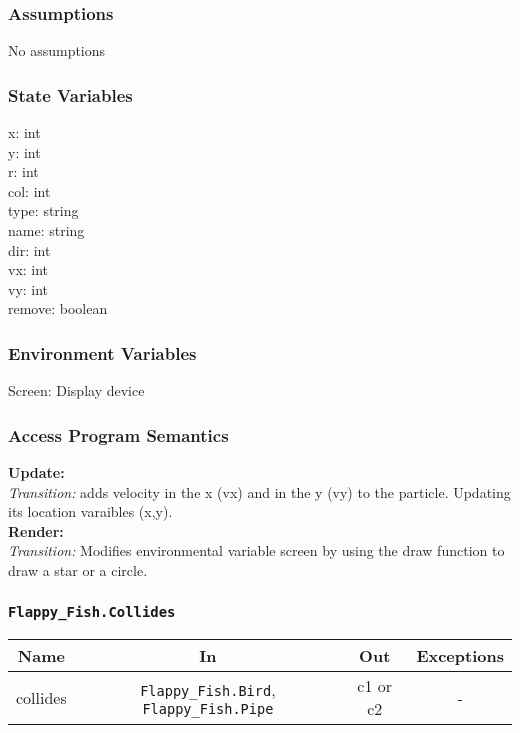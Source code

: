 \documentclass[11pt, oneside]{article}   	%
\begin{document}
\subsubsection{Assumptions}
No assumptions

\subsubsection{State Variables}
x: int\\
y: int\\
r: int \\
col: int \\
type: string\\
name: string \\
dir: int\\
vx: int \\
vy: int \\
remove: boolean \\



\subsubsection{Environment Variables}
Screen: Display device\\



\subsubsection{Access Program Semantics} 
 \textbf{Update:}  \\
 \textit{Transition:} adds velocity in the x (vx) and in the y (vy) to the particle. Updating its location varaibles (x,y).\\
 \textbf{Render:}  \\
 \textit{Transition:} Modifies environmental variable screen by using the draw function to draw a star or a circle.\\

\subsubsection{\texttt{Flappy\_Fish.Collides}}



\begin{center}
\begin{tabular}{ |c|c|c|c| } 
 \hline
 Name & In & Out & Exceptions \\ 
 \hline \hline
 collides & \texttt{Flappy\_Fish.Bird}, \texttt{Flappy\_Fish.Pipe} & c1 or c2 & - \\ 

 \hline
\end{tabular}
\end{center}
\end{document}
